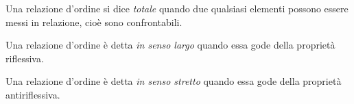 \begin{definizione}
Una relazione d'ordine si dice \emph{totale} quando due qualsiasi elementi possono essere messi in relazione, cioè sono confrontabili.
\end{definizione}

\begin{definizione}
Una relazione d'ordine è detta \emph{in senso largo} quando essa gode della proprietà riflessiva.
\end{definizione}

\begin{definizione}
Una relazione d'ordine è detta \emph{in senso stretto} quando essa gode della proprietà antiriflessiva.
\end{definizione}

\begin{center}
 
\end{center}

\ovalbox{\risolvii \ref{ese:B.44}, \ref{ese:B.45}, \ref{ese:B.46}, \ref{ese:B.47}, \ref{ese:B.48}, \ref{ese:B.49}, \ref{ese:B.50}, \ref{ese:B.51},
\ref{ese:B.52}, \ref{ese:B.53}, \ref{ese:B.54}}

\ovalbox{ \ref{ese:B.55}, \ref{ese:B.56}, \ref{ese:B.57}, \ref{ese:B.58}, \ref{ese:B.59}, \ref{ese:B.60},
\ref{ese:B.61},\ref{ese:B.62}, \ref{ese:B.63}}
\newpage

\cleardoublepage
